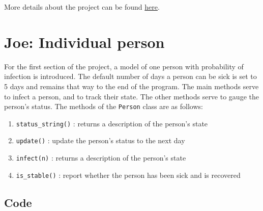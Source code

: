 \documentclass[paper=a4, fontsize=11pt]{scrartcl}
\begin{document}
More details about the project can be found \href{https://piazza-resources.s3.amazonaws.com/jl5ldloccoz56h/jp36blc6lx9310/C_Final_Project.pdf?X-Amz-Algorithm=AWS4-HMAC-SHA256&X-Amz-Credential=ASIAR6AWVCBX6T4JUSHR%2F20181205%2Fus-east-1%2Fs3%2Faws4_request&X-Amz-Date=20181205T072122Z&X-Amz-Expires=3600&X-Amz-SignedHeaders=host&X-Amz-Security-Token=FQoGZXIvYXdzEOb%2F%2F%2F%2F%2F%2F%2F%2F%2F%2FwEaDLIw8KZ2GD9AShcW%2BCK3A05z6IYjnHIiRhbpImNJl1foZfkfIMrntWPol0C%2F9Dwx13kQaY4luYRTHIlRogGoHzrhVDqeyynrIpGX4nXZzle7TkbRGVdqzpD1zixdlLSW2YhffAkIAwhkyvPsAIld17ja6z77J%2Be%2FdDQP36fDC5f2drLB6nvn7vduLpx4WuF7nZZNPHfpHES3D2EGBGe9enQDalfIhjyoVnzKyLzHwAg%2F5Re7erO7R3yYcH9Duk%2B8lOZdVyfqorgb2Oy7bx%2F0KwVZ%2F826e%2BnwgUYRjFpIbd5%2FSY21CldZwzCH5aenlGSzWZoryaTmtuf8lXK%2BFkG8P3NNRCHKYCe67khC2dE1H%2BgC0Pj7NdEyvVOMRXFkpgTElRBE6cB8EJE8TTyP6Hg02beDkjXTryUMNMoNUQ9oXVCuonAlX1PbwoirKO2vGrxSAw2aljHbpKkawptUQp7x%2FA4tqG%2BIUQJgNb%2BfrAg95b1rbSAwawSlwlkgnUQ5hu1eZc84YpZ4Pww%2FiUFr8LyKZ%2B0DcWFnMz%2BeiisBhG99qy6cUVjcVSJ9pqDXnlMM4542k63tNPKvKI2yxhKghd%2Bp0LiM%2FXkqVQ8oup%2Bd4AU%3D&X-Amz-Signature=968b75046a261b20ee5929a8b0e5c5a9090c0795586112f2ec4f513a03f5678d}{here}.

\section{Joe: Individual person}

For the first section of the project, a model of one person with probability of infection is introduced. The default number of days a person can be sick is set to 5 days and remains that way to the end of the program. The main methods serve to infect a person, and to track their state. The other methods serve to gauge the person's status. The methods of the \texttt{Person} class are as follows:\\

\begin{enumerate}
	\item  \texttt{status\_string()} : returns a description of the person’s state
	\item \texttt{update()} :  update the person’s status to the next day
	\item \texttt{infect(n)} : returns a description of the person’s state
	\item \texttt{is\_stable()} : report whether the person has been sick and is recovered
\end{enumerate}	

\newpage
\subsection{Code}
\end{document}
